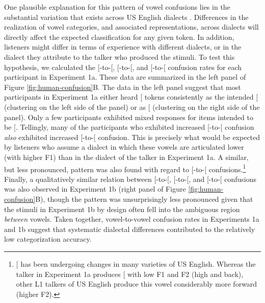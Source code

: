 \documentclass[preprint]{JASA}
\begin{document}
One plausible explanation for this pattern of vowel confusions lies in the substantial variation that exists across US English dialects \citep{atlasnae}. Differences in the realization of vowel categories, and associated representations, across dialects will directly affect the expected classification for any given token. In addition, listeners might differ in terms of experience with different dialects, or in the dialect they attribute to the talker who produced the stimuli. To test this hypothesis, we calculated the {[}\textipa{I}{]}-to-{[}\textipa{E}{]}, {[}\textipa{E}{]}-to-{[}\textipa{\ae}{]}, and {[}\textipa{u}{]}-to-{[}\textipa{U}{]} confusion rates for each participant in Experiment 1a. These data are summarized in the left panel of Figure \ref{fig:human-confusion}B. The data in the left panel suggest that most participants in Experiment 1a either heard {[}\textipa{I}{]} tokens consistently as the intended {[}\textipa{I}{]} (clustering on the left side of the panel) or as {[}\textipa{E}{]} (clustering on the right side of the panel). Only a few participants exhibited mixed responses for items intended to be {[}\textipa{I}{]}. Tellingly, many of the participants who exhibited increased {[}\textipa{I}{]}-to-{[}\textipa{E}{]} confusion \emph{also} exhibited increased {[}\textipa{E}{]}-to-{[}\textipa{\ae}{]} confusion. This is precisely what would be expected by listeners who assume a dialect in which these vowels are articulated lower (with higher F1) than in the dialect of the talker in Experiment 1a. A similar, but less pronounced, pattern was also found with regard to {[}\textipa{u}{]}-to-{[}\textipa{U}{]} confusions.\footnote{{[}\textipa{u}{]} has been undergoing changes in many varieties of US English. Whereas the talker in Experiment 1a produces {[}\textipa{u}{]} with low F1 and F2 (high and back), other L1 talkers of US English produce this vowel considerably more forward (higher F2).} Finally, a qualitatively similar relation between {[}\textipa{I}{]}-to-{[}\textipa{E}{]}, {[}\textipa{E}{]}-to-{[}\textipa{\ae}{]}, and {[}\textipa{u}{]}-to-{[}\textipa{U}{]} confusions was also observed in Experiment 1b (right panel of Figure \ref{fig:human-confusion}B), though the pattern was unsurprisingly less pronounced given that the stimuli in Experiment 1b by design often fell into the ambiguous region \emph{between} vowels. Taken together, vowel-to-vowel confusion rates in Experiments 1a and 1b suggest that systematic dialectal differences contributed to the relatively low categorization accuracy.
\end{document}
